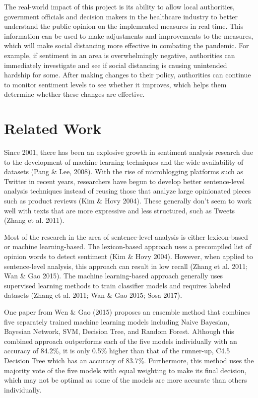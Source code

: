 \documentclass[letterpaper]{article} %
\begin{document}
The real-world impact of this project is its ability to allow local authorities, government officials and decision makers in the healthcare industry to better understand the public opinion on the implemented measures in real time. This information can be used to make adjustments and improvements to the measures, which will make social distancing more effective in combating the pandemic. For example, if sentiment in an area is overwhelmingly negative, authorities can immediately investigate and see if social distancing is causing unintended hardship for some. After making changes to their policy, authorities can continue to monitor sentiment levels to see whether it improves, which helps them determine whether these changes are effective.



\section{Related Work}

Since 2001, there has been an explosive growth in sentiment analysis research due to the development of machine learning techniques and the wide availability of datasets (Pang \& Lee, 2008). With the rise of microblogging platforms such as Twitter in recent years, researchers have begun to develop better sentence-level analysis techniques instead of reusing those that analyze large opinionated pieces such as product reviews (Kim \& Hovy 2004). These generally don't seem to work well with texts that are more expressive and less structured, such as Tweets (Zhang et al. 2011). 

Most of the research in the area of sentence-level analysis is either lexicon-based or machine learning-based. The lexicon-based approach uses a precompiled list of opinion words to detect sentiment (Kim \& Hovy 2004). However, when applied to sentence-level analysis, this approach can result in low recall (Zhang et al. 2011; Wan \& Gao 2015). The machine learning-based approach generally uses supervised learning methods to train classifier models and requires labeled datasets (Zhang et al. 2011; Wan \& Gao 2015; Sosa 2017).

One paper from Wen \& Gao (2015) proposes an ensemble method that combines five separately trained machine learning models including Naive Bayesian, Bayesian Network, SVM, Decision Tree, and Random Forest. Although this combined approach outperforms each of the five models individually with an accuracy of 84.2\%, it is only 0.5\% higher than that of the runner-up, C4.5 Decision Tree which has an accuracy of 83.7\%. Furthermore, this method uses the majority vote of the five models with equal weighting to make its final decision, which may not be optimal as some of the models are more accurate than others individually.
\end{document}
